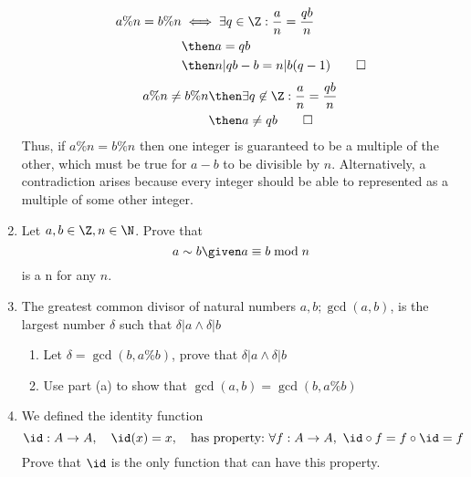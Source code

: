 \documentclass[basic, header]{nosvagor-notes}
\begin{document}
\begin{enumerate}[itemsep=4em]
      \begin{align*}
        a\%n = b\%n &\iff \exists q \in \Z : \frac{a}{n} = \frac{qb}{n} \\
                    &\then a=qb \\
                    &\then n|qb-b = n|b(q-1) \qed
      \end{align*}
      \begin{align*}
        a\%n \neq b\%n &\then \exists q \not\in \Z : \frac{a}{n} = \frac{qb}{n} \\
                       &\then a \neq qb \qed
      \end{align*}
      Thus, if \(a\%n = b\%n\) then one integer is guaranteed to be a
      multiple of the other, which must be true for \(a-b\) to be divisible by
      \(n\). Alternatively, a contradiction arises because
      every integer should be able to represented as a multiple of some other
      integer.

  \newpage %

    \item Let \(a, b \in \Z, n \in \N\). Prove that \[a \sim b \given a \equiv
      b \bmod n\]
      is a n
      for any \(n\).

    \item The greatest common divisor of natural numbers \(a, b; \gcd(a,b) \),
      is the largest number \(\delta\) such that \(\delta|a \land \delta|b\)
      \begin{enumerate}

        \item Let \(\delta = \gcd(b, a\%b)\), prove that \(\delta|a \land
          \delta|b\)

        \item Use part (a) to show that \(\gcd(a,b) = \gcd(b, a\%b)\)

      \end{enumerate}

  \newpage %

    \item We defined the identity function
      \[%
       \id : A \to A, \quad \id(x) = x, \quad  \text{has property:}~\forall f :
       A\to A,~ \id \circ f = f \circ \id = f
      \]%
      Prove that \(\id\) is the only function that can have this property.

\end{enumerate}
\end{document}
